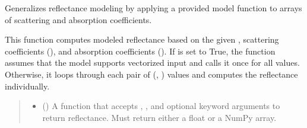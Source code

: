 \documentclass[letterpaper,10pt,english]{sphinxmanual}
\begin{document}

\begin{fulllineitems}
\label{\detokenize{generated/photon_canon.utils:photon_canon.utils.model_reflectance}}
\pysigstartsignatures
\pysiglinewithargsret
{}
{\sphinxparamcomma {}\sphinxparamcomma {}\sphinxparamcomma {}\sphinxparamcomma {}}
{}
\pysigstopsignatures
\sphinxAtStartPar
Generalizes reflectance modeling by applying a provided model function to arrays of scattering and absorption coefficients.

\sphinxAtStartPar
This function computes modeled reflectance based on the given , scattering coefficients (),
and absorption coefficients (). If  is set to True, the function assumes that the model
supports vectorized input and calls it once for all values. Otherwise, it loops through each pair
of (, ) values and computes the reflectance individually.
\begin{quote}\begin{description}
\begin{itemize}
\item {} 
\sphinxAtStartPar
{} (\sphinxstyleliteralemphasis{\sphinxupquote{{[}}}\sphinxstyleliteralemphasis{\sphinxupquote{{[}}}\sphinxstyleliteralemphasis{\sphinxupquote{, }}\sphinxstyleliteralemphasis{\sphinxupquote{, }}\sphinxstyleliteralemphasis{\sphinxupquote{{]}}}\sphinxstyleliteralemphasis{\sphinxupquote{, }}\sphinxstyleliteralemphasis{\sphinxupquote{{[}}}\sphinxstyleliteralemphasis{\sphinxupquote{, }}\sphinxstyleliteralemphasis{\sphinxupquote{{]}}}\sphinxstyleliteralemphasis{\sphinxupquote{{]}}}) \textendash{} A function that accepts , , and optional keyword arguments to return reflectance.
Must return either a float or a NumPy array.


\end{itemize}
\end{description}
\end{quote}
\end{fulllineitems}
\end{document}
